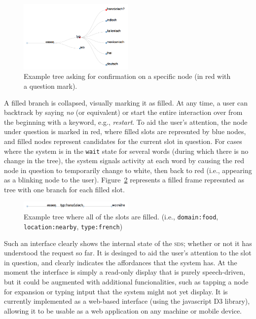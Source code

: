 \documentclass[11pt]{article}
\newcommand{\sds}[0]{\textsc{sds}}
\begin{document}
\begin{figure}[ht]
  \centering
      \includegraphics[width=0.5\textwidth]{figures/diatree-confirmation.png}	
      \caption{Example tree asking for confirmation on a specific node (in red with a question mark).\label{fig:confirm}}
\end{figure}

A filled  branch is collapsed, visually marking it as filled. At any time, a user can backtrack by saying \emph{no} (or equivalent) or start the entire interaction over from the beginning with a keyword, e.g., \emph{restart}. To aid the user's attention, the node under question is marked in red, where filled slots are represnted by blue nodes, and filled nodes represent candidates for the current slot in question. For cases where the system is in the \texttt{wait} state for several words (during which there is no change in the tree), the system signals activity at each word by causing the red node in question to temporarily change to white, then back to red (i.e., appearing as a blinking node to the user). Figure~\ref{fig:filled} represents a filled frame represnted as tree with one branch for each filled slot.

\begin{figure}[ht]
  \centering
      \includegraphics[width=0.5\textwidth]{figures/diatree-filled.png}	
      \caption{Example tree where all of the slots are filled. (i.e., \texttt{domain:food}, \texttt{location:nearby}, \texttt{type:french}) \label{fig:filled}}
\end{figure}

Such an interface clearly shows the internal state of the \sds; whether or not it has understood the request so far. It is desinged to aid the user's attention to the slot in question, and clearly indicates the affordances that the system has. At the moment the interface is simply a read-only display that is purely speech-driven, but it could be augmented with additional funcionalities, such as tapping a node for expansion or typing intput that the system might not yet display. It is currently implemented as a web-based interface (using the javascript D3 library), allowing it to be usable as a web application on any machine or mobile device. 
\end{document}

